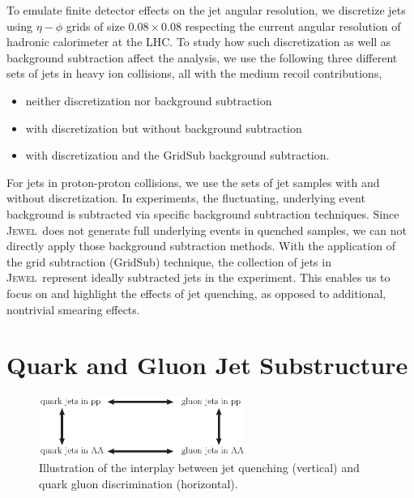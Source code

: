 \documentclass[notoc]{JHEP3}
\newcommand{\jw}{\textsc{Jewel}~}
\begin{document}
To emulate finite detector effects on the jet angular resolution, we discretize jets using $\eta-\phi$ grids of size $0.08 \times 0.08$ respecting the current angular resolution of hadronic calorimeter at the LHC. To study how such discretization as well as background subtraction affect the analysis, we use the following three different sets of jets in heavy ion collisions, all with the medium recoil contributions,
\begin{itemize}
	\item neither discretization nor background subtraction
	\item with discretization but without background subtraction
	\item with discretization and the GridSub \cite{KunnawalkamElayavalli:2017hxo} background subtraction.
\end{itemize}
For jets in proton-proton collisions, we use the sets of jet samples with and without discretization. In experiments, the fluctuating, underlying event background is subtracted via specific background subtraction techniques. Since \jw does not generate full underlying events in quenched samples, we can not directly apply those background subtraction methods. With the application of the grid subtraction (GridSub) technique, the collection of jets in \jw represent ideally subtracted jets in the experiment. This enables us to focus on and highlight the effects of jet quenching, as opposed to additional, nontrivial smearing effects.

\section{Quark and Gluon Jet Substructure}
\label{sec:qg}
\begin{figure}[t]
	   \centering
	   \includegraphics[width=0.6\textwidth]{plots/qg_HI}
	   \caption{Illustration of the interplay between jet quenching (vertical) and quark gluon discrimination (horizontal). }
	   \label{fig:quenching_discrimination}
\end{figure}
\end{document}
